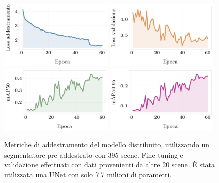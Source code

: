 \documentclass[12pt]{report}
\begin{document}
\begin{figure}[h!]
	\centering
	{\includegraphics[width=0.48\textwidth]{images/fog-robotics/real-to-real/9/train-loss}}
	\hspace{0.01\textwidth}
	{\includegraphics[width=0.48\textwidth]{images/fog-robotics/real-to-real/9/validation-loss}}
	\hspace{0.01\textwidth}
	\\
	{\includegraphics[width=0.48\textwidth]{images/fog-robotics/real-to-real/9/map50}}
	\hspace{0.01\textwidth}
	{\includegraphics[width=0.48\textwidth]{images/fog-robotics/real-to-real/9/map50-95}}
	\caption{Metriche di addestramento del modello distribuito, utilizzando un segmentatore pre-addestrato con 395 scene. Fine-tuning e validazione effettuati con dati provenienti da altre 20 scene. È stata utilizzata una UNet con solo 7.7 milioni di parametri.}
	\label{fig:training-7}
\end{figure}
\end{document}
